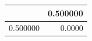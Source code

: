 \begin{tabular}{lr}
\toprule
 & 0.500000 \\
\midrule
0.500000 & 0.0000 \\
\bottomrule
\end{tabular}
